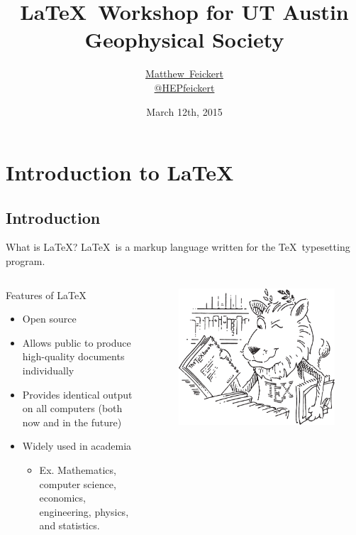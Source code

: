 \documentclass[]{beamer}
\title[\LaTeX~Workshop for UT Austin SEG] 
{%
\LaTeX~Workshop for UT Austin\\ Geophysical Society%
}
\author[Matthew Feickert]			%
{
  \textcolor{blue!50!black}{\href{http://www.matthewfeickert.com/}{Matthew~Feickert}}\inst{1}\\ \vspace{0.25cm}\href{https://twitter.com/HEPfeickert}{@HEPfeickert}
}
\institute[SMU Physics]
{
  \inst{1}%
  \href{http://www.physics.smu.edu/web/}{Southern Methodist University}
}
\date[March 12th, 2015]
{March 12th, 2015}
\begin{document}
\begin{frame}
  \titlepage
\end{frame}

\section{Introduction to \LaTeX}

\subsection*{Introduction}

\begin{frame}{What is \LaTeX?}
\LaTeX~is a markup language written for the \TeX~typesetting program.
\begin{columns}[c]
\column{2.50in}
  \begin{block}{Features of \LaTeX}
    \begin{itemize}
    			\item Open source
    			\item Allows public to produce high-quality documents individually
			\item Provides identical output on all computers (both now and in the future)
			\item Widely used in academia
				\begin{itemize}
					\item Ex. Mathematics, computer science, economics, engineering, physics, and statistics.
				\end{itemize}
    \end{itemize}
  \end{block}
\column{1.50in}
\begin{figure}[h!]
\centering
\includegraphics[width=\textwidth]{CTAN_Lion.pdf}

\end{figure}
\end{columns}
\end{frame}
\end{document}
